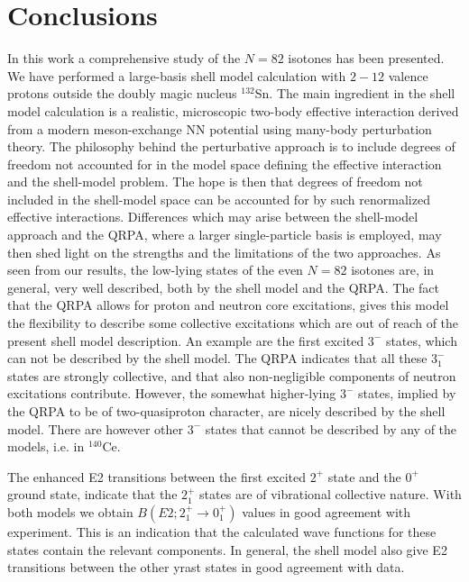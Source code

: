 \section{Conclusions}

In this work a comprehensive study of the $N=82$ isotones has been 
presented. We have performed a large-basis shell model calculation with 
$2 - 12$ valence protons outside  the doubly magic nucleus $^{132}$Sn. The 
main ingredient in the shell model calculation is a realistic, 
microscopic two-body effective interaction derived from a modern 
meson-exchange NN potential using many-body perturbation theory. 
The philosophy behind the perturbative approach is to include degrees
of freedom not accounted for in the model space defining the effective
interaction and the shell-model problem. The hope is then that
degrees of freedom not included in the shell-model
space can be accounted for by such renormalized effective
interactions. Differences which may arise between the shell-model
approach and the QRPA, where a larger single-particle basis is employed,
may then shed light on the strengths and the limitations of the two approaches.
As seen from our results, 
the low-lying states of the even $N=82$ isotones are, in general, very well
described, both by the shell model and the QRPA. The fact that the QRPA allows
for proton and neutron core excitations, gives this model the flexibility to
describe some collective excitations 
which are out of reach of the present shell 
model description. An example are the first excited $3^{-}$ states, which can 
not be described by the shell model. The QRPA indicates that all these 
$3^{-}_{1}$ states are strongly collective, and that also non-negligible 
components of neutron excitations contribute. However, the somewhat 
higher-lying $3^{-}$ states, implied by the QRPA to be of two-quasiproton
character, are nicely described by the shell model. There are however other
$3^{-}$ states that cannot be described 
by any of the models, i.e. in $^{140}$Ce.

The enhanced E2 transitions between the first excited $2^{+}$ state and the 
$0^{+}$ ground state, indicate that the $2^{+}_{1}$ states are of vibrational
collective nature. With both models we obtain $B(E2;2^{+}_{1} \rightarrow 
0^{+}_{1})$ values in good agreement with experiment. This is an indication 
that the calculated wave functions for these states contain the relevant 
components. In general, the shell model also give E2 transitions between 
the other yrast states in good agreement with data.

